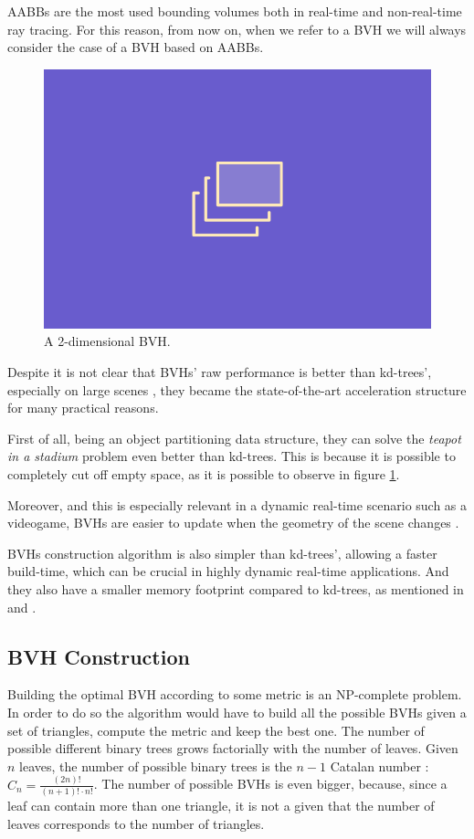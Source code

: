 \documentclass{PoliMi_MasterThesis}
\begin{document}
AABBs are the most used bounding volumes both in real-time and non-real-time ray tracing. For this reason, from now on, when we refer to a BVH we will always consider the case of a BVH based on AABBs.

\begin{figure}[H]
    \centering
    \includegraphics[scale=0.4]{Images/TODO.png}
    \caption{A 2-dimensional BVH.}
    \label{fig:bvh_2d}
\end{figure}

Despite it is not clear that BVHs' raw performance is better than kd-trees', especially on large scenes \cite{bvh_vs_kd_tree}, they became the state-of-the-art acceleration structure for many practical reasons.

First of all, being an object partitioning data structure, they can solve the \textit{teapot in a stadium} problem even better than kd-trees. This is because it is possible to completely cut off empty space, as it is possible to observe in figure \ref{fig:bvh_2d}.

Moreover, and this is especially relevant in a dynamic real-time scenario such as a videogame, BVHs are easier to update when the geometry of the scene changes \cite{bvh_update}.

BVHs construction algorithm is also simpler than kd-trees', allowing a faster build-time, which can be crucial in highly dynamic real-time applications. And they also have a smaller memory footprint compared to kd-trees, as mentioned in \cite{bvh_spatial_splitting} and \cite{bvh_advantages}.

\subsection{BVH Construction} \label{ssec:bvh_construction}
Building the optimal BVH according to some metric is an NP-complete problem. In order to do so the algorithm would have to build all the possible BVHs given a set of triangles, compute the metric and keep the best one. The number of possible different binary trees grows factorially with the number of leaves. Given $n$ leaves, the number of possible binary trees is the $n-1$ Catalan number \cite{catalan_numbers}: $C_{n} = \frac{(2n)!}{(n+1)! \cdot n!}$. The number of possible BVHs is even bigger, because, since a leaf can contain more than one triangle, it is not a given that the number of leaves corresponds to the number of triangles.
\end{document}
